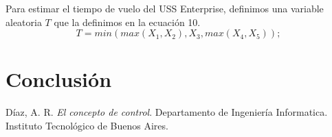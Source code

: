 \documentclass[10pt,journal,compsoc]{IEEEtran}
\begin{document}
Para estimar el tiempo de vuelo del USS Enterprise, definimos una variable aleatoria $T$ que la definimos en la ecuaci\'on 10.
\begin{equation}
T = min( max(X_1, X_2), X_3, max(X_4, X_5) );
\end{equation}

%

\section{Conclusi\'on}

\begin{thebibliography}{1}

D\'iaz, A. R. \emph{El concepto de control}. Departamento de Ingenier\'ia Informatica. 
Instituto Tecnol\'ogico de Buenos Aires.
\end{thebibliography}
\end{document}
